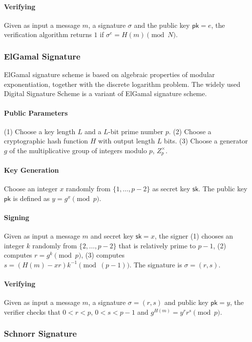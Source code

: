 \paragraph{Verifying} Given as input a message $m$, a signature $\sigma$ and the public key $\mathsf{pk}=e$, the verification algorithm returns $1$ if $\sigma^e=H(m)\pmod{N}$. 

\subsubsection{ElGamal Signature}
ElGamal signature scheme is based on algebraic properties of modular exponentiation, together with the discrete logarithm problem. The widely used Digital Signature Scheme is a variant of ElGamal signature scheme. 

\paragraph{Public Parameters} (1) Choose a key length $L$ and a $L$-bit prime number $p$. (2) Choose a cryptographic hash function $H$ with output length $L$ bits. (3) Choose a generator $g$ of the multiplicative group of integers modulo $p$, $Z_p^\times$. 

\paragraph{Key Generation} Choose an integer $x$ randomly from $\{1,\dots, p-2\}$ as secret key $\mathsf{sk}$. The public key $\mathsf{pk}$ is defined as $y=g^x\pmod{p}$. 

\paragraph{Signing} Given as input a message $m$ and secret key $\mathsf{sk}=x$, the signer (1) chooses an integer $k$ randomly from $\{2,\dots, p-2\}$ that is relatively prime to $p-1$, (2) computes $r=g^k\pmod{p}$, (3) computes $s=(H(m)-xr)k^{-1}\pmod{(p-1)}$. The signature is $\sigma=(r,s)$. 

\paragraph{Verifying} Given as input a message $m$, a signature $\sigma=(r,s)$ and public key $\mathsf{pk}=y$, the verifier checks that $0<r<p$, $0<s<p-1$ and $g^{H(m)}=y^r r^s\pmod{p}$. 


\subsubsection{Schnorr Signature}

